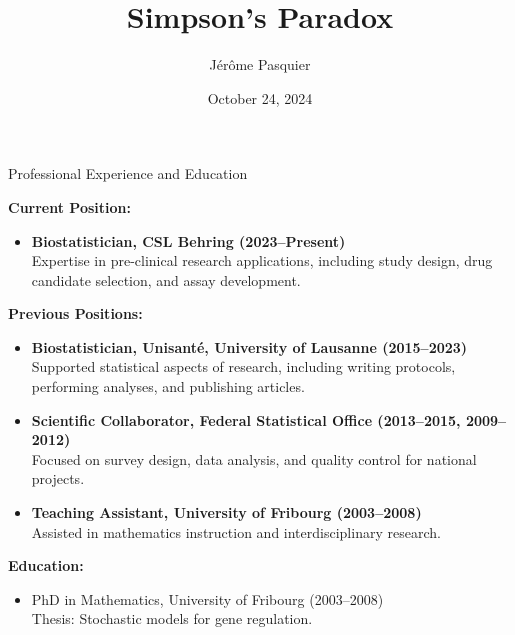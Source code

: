 \documentclass[8pt,aspectratio=169]{beamer}
\title{Simpson's Paradox}
\author{Jérôme Pasquier}
\date{October 24, 2024}
\begin{document}

\maketitle


\begin{frame}

  \centering

  \faGithub \hspace{1pt} \href{\githubURL}{\githubURL}

\end{frame}


\begin{frame}{Professional Experience and Education}

  \textbf{Current Position:}
  \begin{itemize}
    \item {\bfseries Biostatistician, CSL Behring (2023–Present)} \\
      Expertise in pre-clinical research applications, including study design,
      drug candidate selection, and assay development.
  \end{itemize}

  \textbf{Previous Positions:}
  \begin{itemize}
    \item {\bfseries Biostatistician, Unisanté, University of Lausanne
      (2015–2023)} \\
      Supported statistical aspects of research, including writing protocols,
      performing analyses, and publishing articles.
    \item {\bfseries Scientific Collaborator, Federal Statistical Office
      (2013–2015, 2009–2012)} \\
      Focused on survey design, data analysis, and quality control for national
      projects.
    \item {\bfseries Teaching Assistant, University of Fribourg (2003–2008)} \\
      Assisted in mathematics instruction and interdisciplinary research.
  \end{itemize}

  \textbf{Education:}
  \begin{itemize}
    \item PhD in Mathematics, University of Fribourg (2003–2008) \\
      Thesis: Stochastic models for gene regulation.
  \end{itemize}

\end{frame}
\end{document}
